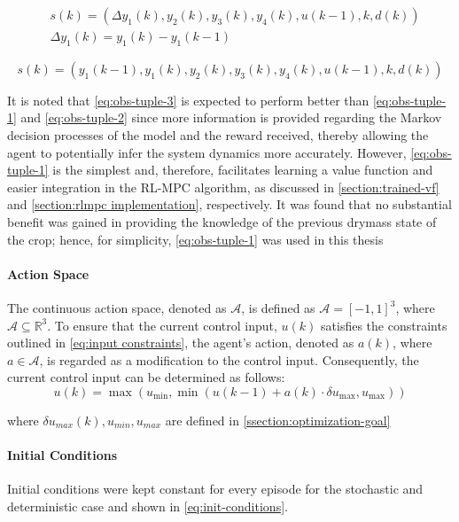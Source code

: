\begin{equation}\label{eq:obs-tuple-2}
\begin{aligned}
    & s(k) = (\Delta y_1(k),y_2(k),y_3(k),y_4(k), u(k-1), k, d(k)) \\
    & \Delta y_1(k) = y_1(k) - y_1(k-1)
\end{aligned}
\end{equation}


\begin{equation}\label{eq:obs-tuple-3}
    s(k) = (y_1(k-1),y_1(k),y_2(k),y_3(k),y_4(k), u(k-1), k, d(k))
\end{equation}

It is noted that \autoref{eq:obs-tuple-3} is expected to perform better than \autoref{eq:obs-tuple-1} and \autoref{eq:obs-tuple-2} since more information is provided regarding the Markov decision processes of the model and the reward received, thereby allowing the agent to potentially infer the system dynamics more accurately. However, \autoref{eq:obs-tuple-1} is the simplest and, therefore, facilitates learning a value function and easier integration in the RL-MPC algorithm, as discussed in \autoref{section:trained-vf} and \autoref{section:rlmpc implementation}, respectively. It was found that no substantial benefit was gained in providing the knowledge of the previous drymass state of the crop; hence, for simplicity, \autoref{eq:obs-tuple-1} was used in this thesis

\paragraph{Action Space}
The continuous action space, denoted as \( \mathcal{A} \), is defined as \( \mathcal{A} = [-1, 1]^3 \), where \( \mathcal{A} \subseteq \mathbb{R}^3 \). To ensure that the current control input, $u(k)$ satisfies the constraints outlined in \autoref{eq:input constraints}, the agent’s action, denoted as  $a(k)$, where $a \in \mathcal{A}$, is regarded as a modification to the control input. Consequently, the current control input can be determined as follows:
$$
u(k) = \max(u_{\min}, \min(u(k-1) + a(k) \cdot \delta u_{\max}, u_{\max}))
$$

where $\delta u_{max}(k),u_{min}, u_{max}$ are defined in \autoref{ssection:optimization-goal}

\paragraph{Initial Conditions}
Initial conditions were kept constant for every episode for the stochastic and deterministic case and shown in \autoref{eq:init-conditions}.

